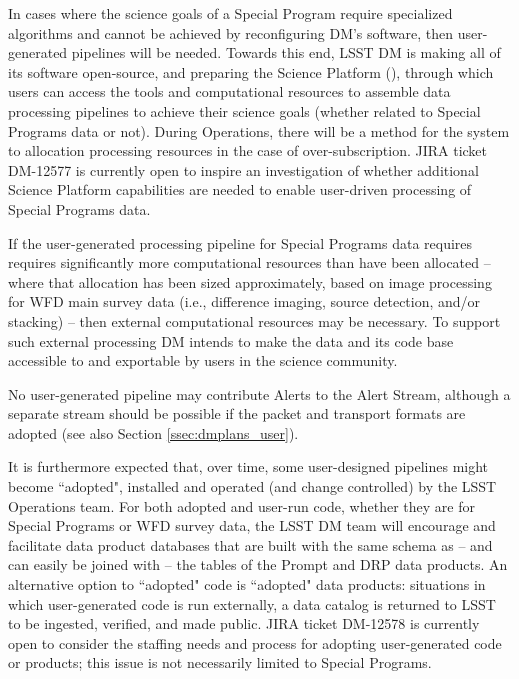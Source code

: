 \documentclass[DM,lsstdoc,toc]{lsstdoc}
\begin{document}
In cases where the science goals of a Special Program require specialized algorithms and cannot be achieved by reconfiguring DM's software, then user-generated pipelines will be needed. Towards this end, LSST DM is making all of its software open-source, and preparing the Science Platform (), through which users can access the tools and computational resources to assemble data processing pipelines to achieve their science goals (whether related to Special Programs data or not). During Operations, there will be a method for the system to allocation processing resources in the case of over-subscription. JIRA ticket DM-12577 is currently open to inspire an investigation of whether additional Science Platform capabilities are needed to enable user-driven processing of Special Programs data.

If the user-generated processing pipeline for Special Programs data requires requires significantly more computational resources than have been allocated -- where that allocation has been sized approximately, based on image processing for WFD main survey data (i.e., difference imaging, source detection, and/or stacking) -- then external computational resources may be necessary. To support such external processing DM intends to make the data and its code base accessible to and exportable by users in the science community.

No user-generated pipeline may contribute Alerts to the Alert Stream, although a separate stream should be possible if the packet and transport formats are adopted (see also Section \ref{ssec:dmplans_user}).

It is furthermore expected that, over time, some user-designed pipelines might become ``adopted", installed and operated (and change controlled) by the LSST Operations team. For both adopted and user-run code, whether they are for Special Programs or WFD survey data, the LSST DM team will encourage and facilitate data product databases that are built with the same schema as -- and can easily be joined with -- the tables of the Prompt and DRP data products. An alternative option to ``adopted" code is ``adopted" data products: situations in which user-generated code is run externally, a data catalog is returned to LSST to be ingested, verified, and made public. JIRA ticket DM-12578 is currently open to consider the staffing needs and process for adopting user-generated code or products; this issue is not necessarily limited to Special Programs. 


\clearpage
\end{document}
